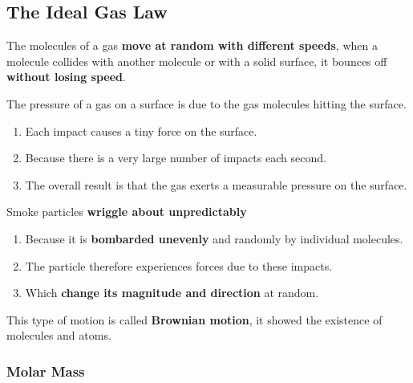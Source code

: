 \subsection{The Ideal Gas Law}

The molecules of a gas \textbf{move at random with different speeds}, when a molecule collides with another molecule or with a solid surface, it bounces off \textbf{without losing speed}.

The pressure of a gas on a surface is due to the gas molecules hitting the surface.
\begin{enumerate}
    \item Each impact causes a tiny force on the surface.
    \item Because there is a very large number of impacts each second.
    \item The overall result is that the gas exerts a measurable pressure on the surface.
\end{enumerate}

Smoke particles \textbf{wriggle about unpredictably}
\begin{enumerate}
    \item Because it is \textbf{bombarded unevenly} and randomly by individual molecules.
    \item The particle therefore experiences forces due to these impacts.
    \item Which \textbf{change its magnitude and direction} at random.
\end{enumerate}
This type of motion is called \textbf{Brownian motion}, it showed the existence of molecules and atoms.

\subsubsection*{Molar Mass}

